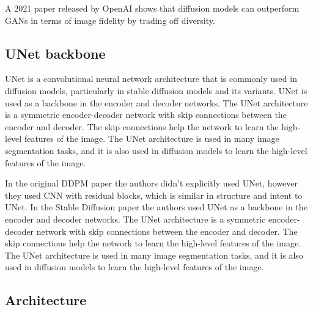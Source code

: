 A 2021 paper released by OpenAI \cite{openai_diffusion_beats_gans} shows that diffusion models can outperform GANs in terms of image fidelity by trading off diversity.














\subsection{UNet backbone}

UNet is a convolutional neural network architecture that is commonly used in diffusion models, particularly in stable diffusion models and its variants. UNet is used as a backbone in the encoder and decoder networks. The UNet architecture is a symmetric encoder-decoder network with skip connections between the encoder and decoder. The skip connections help the network to learn the high-level features of the image. The UNet architecture is used in many image segmentation tasks, and it is also used in diffusion models to learn the high-level features of the image.

In the original DDPM paper \cite{ddpm} the authors didn't explicitly used UNet, however they used CNN with residual blocks, which is similar in structure and intent to UNet. In the Stable Diffusion paper \cite{stable_diffusion} the authors used UNet as a backbone in the encoder and decoder networks. The UNet architecture is a symmetric encoder-decoder network with skip connections between the encoder and decoder. The skip connections help the network to learn the high-level features of the image. The UNet architecture is used in many image segmentation tasks, and it is also used in diffusion models to learn the high-level features of the image.









\subsection{Architecture}

